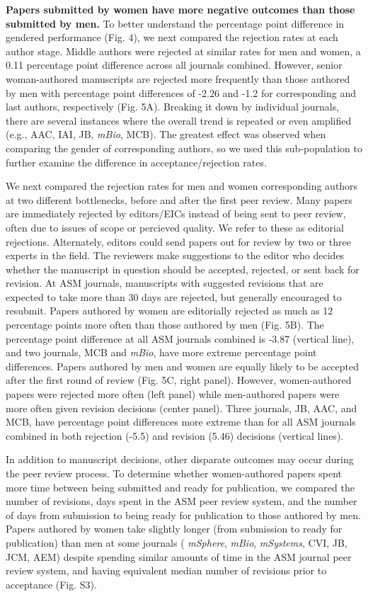 \documentclass[11pt,]{article}
\begin{document}
\textbf{Papers submitted by women have more negative outcomes than those
submitted by men.} To better understand the percentage point difference
in gendered performance (Fig. 4), we next compared the rejection rates
at each author stage. Middle authors were rejected at similar rates for
men and women, a 0.11 percentage point difference across all journals
combined. However, senior woman-authored manuscripts are rejected more
frequently than those authored by men with percentage point differences
of -2.26 and -1.2 for corresponding and last authors, respectively (Fig.
5A). Breaking it down by individual journals, there are several
instances where the overall trend is repeated or even amplified (e.g.,
AAC, IAI, JB, \emph{mBio}, MCB). The greatest effect was observed when
comparing the gender of corresponding authors, so we used this
sub-population to further examine the difference in acceptance/rejection
rates.

We next compared the rejection rates for men and women corresponding
authors at two different bottlenecks, before and after the first peer
review. Many papers are immediately rejected by editors/EICs instead of
being sent to peer review, often due to issues of scope or percieved
quality. We refer to these as editorial rejections. Alternately, editors
could send papers out for review by two or three experts in the field.
The reviewers make suggestions to the editor who decides whether the
manuscript in question should be accepted, rejected, or sent back for
revision. At ASM journals, manuscripts with suggested revisions that are
expected to take more than 30 days are rejected, but generally
encouraged to resubmit. Papers authored by women are editorially
rejected as much as 12 percentage points more often than those authored
by men (Fig. 5B). The percentage point difference at all ASM journals
combined is -3.87 (vertical line), and two journals, MCB and
\emph{mBio}, have more extreme percentage point differences. Papers
authored by men and women are equally likely to be accepted after the
first round of review (Fig. 5C, right panel). However, women-authored
papers were rejected more often (left panel) while men-authored papers
were more often given revision decisions (center panel). Three journals,
JB, AAC, and MCB, have percentage point differences more extreme than
for all ASM journals combined in both rejection (-5.5) and revision
(5.46) decisions (vertical lines).

In addition to manuscript decisions, other disparate outcomes may occur
during the peer review process. To determine whether women-authored
papers spent more time between being submitted and ready for
publication, we compared the number of revisions, days spent in the ASM
peer review system, and the number of days from submission to being
ready for publication to those authored by men. Papers authored by women
take slightly longer (from submission to ready for publication) than men
at some journals ( \emph{mSphere}, \emph{mBio}, \emph{mSystems}, CVI,
JB, JCM, AEM) despite spending similar amounts of time in the ASM
journal peer review system, and having equivalent median number of
revisions prior to acceptance (Fig. S3).
\end{document}
